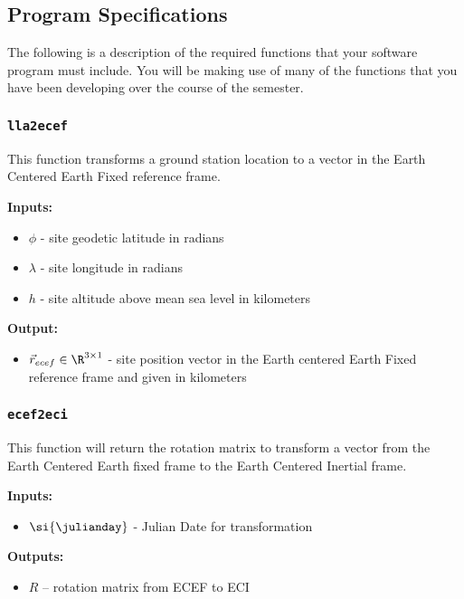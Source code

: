 \documentclass[11pt, reqno]{article}    %
\begin{document}
\subsection*{Program Specifications}

The following is a description of the required functions that your software program must include. 
You will be making use of many of the functions that you have been developing over the course of the semester.


\subsubsection*{\texttt{lla2ecef}}
This function transforms a ground station location to a vector in the Earth Centered Earth Fixed reference frame.

\noindent \textbf{Inputs: }
\begin{itemize}
    \item \( \phi \) - site geodetic latitude in radians
    \item \( \lambda \) - site longitude in radians
    \item \( h \) - site altitude above mean sea level in kilometers
\end{itemize}

\noindent \textbf{Output:}
\begin{itemize}
    \item \( \vec r_{ecef} \in \R^{3 \times 1} \) - site position vector in the Earth centered Earth Fixed reference frame and given in kilometers
\end{itemize}

\subsubsection*{\texttt{ecef2eci}}
This function will return the rotation matrix to transform a vector from the Earth Centered Earth fixed frame to the Earth Centered Inertial frame.

\noindent \textbf{Inputs: }
\begin{itemize}
    \item \( \si{\julianday} \) - Julian Date for transformation
\end{itemize}

\noindent \textbf{Outputs: }
\begin{itemize}
    \item \( R \) -- rotation matrix from ECEF to ECI
\end{itemize}
\end{document}
